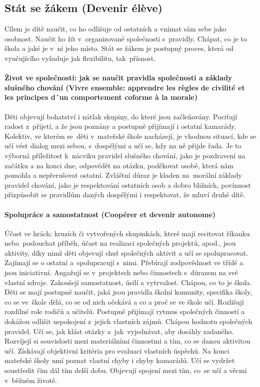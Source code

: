		\subsection{Stát se žákem (Devenir élève)}
			Cílem je dítě naučit, co ho odlišuje od ostatních a vnímat sám sebe jako osobnost. Naučit ho žít v organizované společnosti s pravidly. Chápat, co je to škola a jaké je v ní jeho místo. Stát se žákem je postupný proces, která od vyučujícího vyžaduje jak flexibilitu, tak přísnost.
			\paragraph{Život ve společnosti: jak se naučit pravidla společnosti a základy slušného chování (Vivre ensemble: apprendre les règles de civilité et les principes d´un comportement coforme à la morale)}
				Děti objevují bohatství i nátlak skupiny, do které jsou začleňovány. Pociťují radost z přijetí, a že jsou poznány a postupně přijímají i ostatní kamarády. Kolektiv, ve kterém se děti v mateřské škole nacházejí, je vhodnou situací, kde se učí vést dialog mezi sebou, s dospělými a učí se, kdy na ně přijde řada. Je to výborná příležitost k nácviku pravidel slušného chování, jako je pozdravení na začátku a na konci dne, odpovědět na otázku, poděkovat osobě, která nám pomohla a nepřerušovat ostatní. Zvláštní důraz je kladen na morální základy pravidel chování, jako je respektování ostatních osob a dobro bližních, povinnost přizpůsobit se pravidlům daných dospělými i respektovat, že mluví druhé dítě. 

			\paragraph{Spolupráce a samostatnost (Coopérer et devenir autonome)}
				Účast ve hrách; kruzích či vytvořených skupinkách, které mají recitovat říkanku nebo poslouchat příběh, účast na realizaci společných projektů, apod., jsou aktivity, díky nimž děti objevují chuť společných aktivit a učí se spolupracovat. Zajímají se o ostatní a spolupracují s nimi. Přebírají zodpovědnost ve třídě a jsou iniciativní. Angažují se v projektech nebo činnostech s důrazem na své vlastní zdroje. Zakoušejí samostatnost, úsilí a vytrvalost. Chápou, co to je škola.
				Děti se mají postupně naučit, jaká jsou pravidla školní komunity, specifika školy, co se ve škole dělá, co se od nich očekává a co a proč se ve škole učí. Rozlišují rozdílné role rodičů a učitelů. 
				Postupně přijímají rytmus společných činností a dokážou odlišit uspokojení z jejich vlastních zájmů. Chápou hodnotu společných pravidel. Učí se, jak klást otázky a jak vyjednávat, aby dosáhly zadaného. Rozvíjejí si souvislosti mezi materiálními činnostmi a tím, co se danou aktivitou učí. Získávají objektivní kritéria pro evaluaci vlastních úspěchů. Na konci mateřské školy umí poznat vlastní chyby i chyby kamarádů. Učí se vydržet soustředit čím dál tím delší dobu. Objevují spojení mezi tím, co se učí a věcmi v běžném životě.

